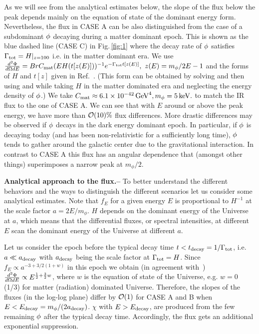 \documentclass[superscriptaddress,aps,preprintnumbers,amsmath,showpacs,amssymb,prd,nofootinbib,reprint]{revtex4-1}
\begin{document}
As we will see from the analytical estimates below, the slope of the flux below the peak depends mainly on the equation of state of the dominant energy form. Nevertheless, the flux in CASE A can be also distinguished from the case of a subdominant $\phi$ decaying during a matter dominant epoch.
This is shown as the blue dashed line (CASE C) in Fig.\,\ref{fig:1} where the decay rate of $\phi$ satisfies $\Gamma_{\rm tot}= H|_{z=100}$ i.e. in the matter dominant era. 
We use  $\frac{d^2\Phi}{d\Omega dE }=Br C_{\rm mat} (E H(t[z(E)]))^{-1} e^{-\Gamma_{\rm tot} t[{z(E)}]},\,\,z(E)=m_\phi/2E-1$ and the forms of $H$ and $t[z]$ given in Ref.~\cite{Jaeckel:2020oet}. 
(This form can be obtained by solving  and then using  and  while taking $H$ in the matter dominated era and neglecting the energy density of $\phi$.)
We take $C_{\rm  mat}\approx 6.1\times 10^{-42}{\rm \, GeV}^4, m_{ \phi}=5{\rm \, keV}.$
to match the IR flux to the one of CASE A.
We can see that with $E$ around or above the peak energy, we have more than $\mathcal{O}(10)\%$ flux differences. 
More drastic differences may be observed if $\phi$ decays in the dark energy dominant epoch. 
In particular, if $\phi$ is decaying today (and has been non-relativistic for a sufficiently long time),  $\phi$ tends to gather around the galactic center due to the gravitational interaction. 
In contrast to CASE A this flux has an angular dependence that (amongst other things) superimposes a narrow peak at $m_{\phi}/2$. 



{\bf Analytical approach to the flux.--} 
To better understand the different behaviors and the ways to distinguish the different scenarios let us consider some analytical estimates.
Note that $f_E$ for a given energy $E$ is proportional to $H^{-1}$ at the scale factor $a=2E/m_\phi$. 
$H$ depends on the dominant energy of the Universe at $a$, which means that the differential fluxes, or spectral intensities,  at different $E$ scan the dominant energy of the Universe at different $a$.

Let us consider the epoch before the typical decay time $t<t_{\rm decay}= 1/\Gamma_{\rm tot}$, i.e. $a\ll a_{\rm decay}$ with $a_{\rm decay}$ being the scale factor at $\Gamma_{\rm tot}=H$.  
Since $f_E \propto a^{-3+3/2(1+w)}$ in this epoch we obtain (in agreement with~\cite{Conlon:2013isa})
$\frac{d^2\Phi}{ d\Omega d E} \propto E^{\frac{1}{2}+\frac{3}{2}w}$,
where $w$ is the equation of state of the Universe, e.g. $w=0$ (1/3) for matter (radiation) dominated Universe. 
Therefore,  the slopes of the fluxes (in the log-log plane) differ by $\mathcal{O}(1)$ for CASE A and B when $E<E_{\rm decay}=m_\phi/(2a_{\rm decay})$. 
$\chi$ with $E>E_{\rm decay}$, are produced from the few remaining $\phi$ after the typical decay time. Accordingly, the flux gets an additional exponential suppression.
\end{document}
